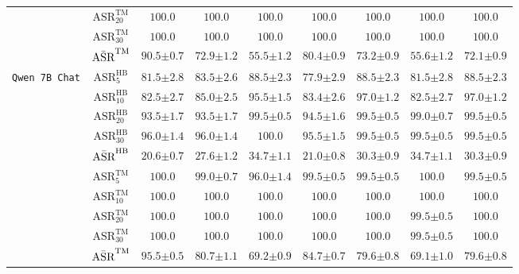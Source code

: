\begin{table}[t]
{\begin{tabular}{c|c||c|c|c|c||c|c|c}
& $\text{ASR}^{\text{TM}}_{20}$ & $\mathbf{100.0}$ & $\mathbf{100.0}$ & $\mathbf{100.0}$ & $\mathbf{100.0}$ & $\mathbf{100.0}$ & $\mathbf{100.0}$ & $\mathbf{100.0}$ \\
& $\text{ASR}^{\text{TM}}_{30}$ & $\mathbf{100.0}$ & $\mathbf{100.0}$ & $\mathbf{100.0}$ & $\mathbf{100.0}$ & $\mathbf{100.0}$ & $\mathbf{100.0}$ & $\mathbf{100.0}$ \\
& $\Bar{\text{ASR}}^{\text{TM}}$ & $\mathbf{90.5{\pm 0.7}}$ & $72.9{\pm 1.2}$ & $55.5{\pm 1.2}$ & $80.4{\pm 0.9}$ & $73.2{\pm 0.9}$ & $55.6{\pm 1.2}$ & $72.1{\pm 0.9}$ \\
\hline
\hline
\multirow{11}{*}{\texttt{Qwen 7B Chat}} 
& $\text{ASR}^{\text{HB}}_{5}$ & $81.5{\pm 2.8}$ & $83.5{\pm 2.6}$ & $88.5{\pm 2.3}$ & $77.9{\pm 2.9}$ & $\mathbf{88.5{\pm 2.3}}$ & $81.5{\pm 2.8}$ & $\mathbf{88.5{\pm 2.3}}$ \\
& $\text{ASR}^{\text{HB}}_{10}$ & $82.5{\pm 2.7}$ & $85.0{\pm 2.5}$ & $95.5{\pm 1.5}$ & $83.4{\pm 2.6}$ & $\mathbf{97.0{\pm 1.2}}$ & $82.5{\pm 2.7}$ & $\mathbf{97.0{\pm 1.2}}$ \\
& $\text{ASR}^{\text{HB}}_{20}$ & $93.5{\pm 1.7}$ & $93.5{\pm 1.7}$ & $99.5{\pm 0.5}$ & $94.5{\pm 1.6}$ & $\mathbf{99.5{\pm 0.5}}$ & $99.0{\pm 0.7}$ & $\mathbf{99.5{\pm 0.5}}$ \\
& $\text{ASR}^{\text{HB}}_{30}$ & $96.0{\pm 1.4}$ & $96.0{\pm 1.4}$ & $\mathbf{100.0}$ & $95.5{\pm 1.5}$ & $99.5{\pm 0.5}$ & $99.5{\pm 0.5}$ & $99.5{\pm 0.5}$ \\
& $\Bar{\text{ASR}}^{\text{HB}}$ & $20.6{\pm 0.7}$ & $27.6{\pm 1.2}$ & $\mathbf{34.7{\pm 1.1}}$ & $21.0{\pm 0.8}$ & $30.3{\pm 0.9}$ & $34.7{\pm 1.1}$ & $30.3{\pm 0.9}$ \\
\cline{2-9}
& $\text{ASR}^{\text{TM}}_{5}$ & $\mathbf{100.0}$ & $99.0{\pm 0.7}$ & $96.0{\pm 1.4}$ & $99.5{\pm 0.5}$ & $99.5{\pm 0.5}$ & $\mathbf{100.0}$ & $99.5{\pm 0.5}$ \\
& $\text{ASR}^{\text{TM}}_{10}$ & $\mathbf{100.0}$ & $\mathbf{100.0}$ & $\mathbf{100.0}$ & $\mathbf{100.0}$ & $\mathbf{100.0}$ & $\mathbf{100.0}$ & $\mathbf{100.0}$ \\
& $\text{ASR}^{\text{TM}}_{20}$ & $\mathbf{100.0}$ & $\mathbf{100.0}$ & $\mathbf{100.0}$ & $\mathbf{100.0}$ & $\mathbf{100.0}$ & $99.5{\pm 0.5}$ & $\mathbf{100.0}$ \\
& $\text{ASR}^{\text{TM}}_{30}$ & $\mathbf{100.0}$ & $\mathbf{100.0}$ & $\mathbf{100.0}$ & $\mathbf{100.0}$ & $\mathbf{100.0}$ & $99.5{\pm 0.5}$ & $\mathbf{100.0}$ \\
& $\Bar{\text{ASR}}^{\text{TM}}$ & $\mathbf{95.5{\pm 0.5}}$ & $80.7{\pm 1.1}$ & $69.2{\pm 0.9}$ & $84.7{\pm 0.7}$ & $79.6{\pm 0.8}$ & $69.1{\pm 1.0}$ & $79.6{\pm 0.8}$ \\
\hline





\end{tabular}}
\end{table}
